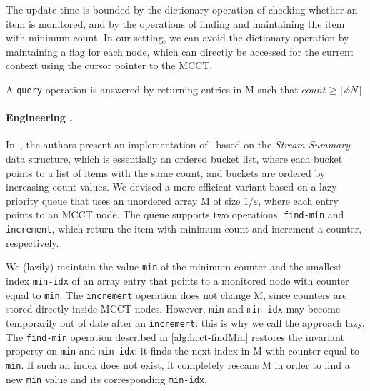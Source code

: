 The update time is bounded by the dictionary operation of checking whether an item is monitored, and by the operations of finding and maintaining the item with minimum count. In our setting, we can avoid the dictionary operation by maintaining a flag for each node, which can directly be accessed for the current context using the cursor pointer to the MCCT.

A {\tt query} operation is answered by returning entries in M such that $count \geq \lfloor\phi N\rfloor$.

\paragraph*{Engineering \spacesaving.} In~\cite{Metwally06}, the authors present an implementation of \spacesaving\ based on the {\em Stream-Summary} data structure, which is essentially an ordered bucket list, where each bucket points to a list of items with the same count, and buckets are ordered by increasing count values. We devised a more efficient variant based on a lazy priority queue that uses an unordered array M of size $1/\varepsilon$, where each entry points to an MCCT node. The queue supports two operations, {\tt find-min} and {\tt increment}, which return the item with minimum count and increment a counter, respectively.

We (lazily) maintain the value {\tt min} of the minimum counter and the smallest index {\tt min-idx} of an array entry that points to a monitored node with counter equal to {\tt min}. The {\tt increment} operation does not change M, since counters are stored directly inside MCCT nodes. However, {\tt min} and {\tt min-idx} may become temporarily out of date after an {\tt increment}: this is why we call the approach lazy. The {\tt find-min} operation described in \myalgorithm\ref{alg:hcct-findMin} restores the invariant property on {\tt min} and {\tt min-idx}: it finds the next index in M with counter equal to {\tt min}. If such an index does not exist, it completely rescans M in order to find a new {\tt min} value and its corresponding {\tt min-idx}.

